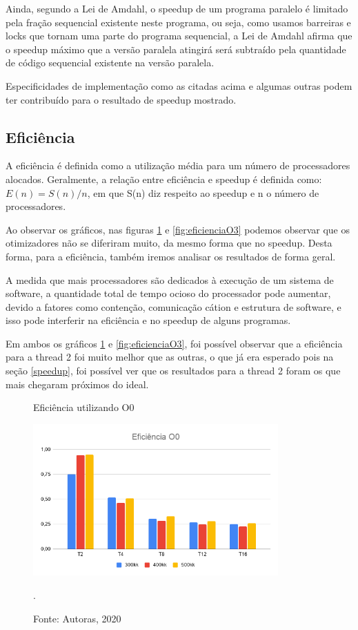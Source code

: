 \documentclass[journal]{IEEEtran}
\begin{document}
 Ainda, segundo a Lei de Amdahl, o speedup de um programa paralelo é limitado pela fração sequencial existente neste programa, ou seja, como usamos barreiras e locks que tornam uma parte do programa sequencial, a Lei de Amdahl afirma que o speedup máximo que a versão paralela atingirá será subtraído pela quantidade de código sequencial existente na versão paralela.
 
 
 Especificidades de implementação como as citadas acima e algumas outras podem ter contribuído para o resultado de speedup mostrado.
 

\subsection{Eficiência}
A eficiência é definida como a utilização média para um número de processadores alocados. Geralmente, a relação entre eficiência e speedup é definida como: $E(n) = S(n)/n$, em que S(n) diz respeito ao speedup e n o número de processadores.

Ao observar os gráficos, nas figuras \ref{fig:eficienciaO0} e \ref{fig:eficienciaO3} podemos observar que os otimizadores não se diferiram muito, da mesmo forma que no speedup. Desta forma, para a eficiência, também iremos analisar os resultados de forma geral. 

A medida que mais processadores são dedicados à execução de um sistema de software, a quantidade total de tempo ocioso do processador pode aumentar, devido a fatores como contenção, comunicação cátion e estrutura de software, e isso pode interferir na eficiência e no speedup de alguns programas.

Em ambos os gráficos \ref{fig:eficienciaO0} e \ref{fig:eficienciaO3}, foi possível observar que a eficiência para a thread 2 foi muito melhor que as outras, o que já era esperado pois na seção \ref{speedup}, foi possível ver que os resultados para a thread 2 foram os que mais chegaram próximos do ideal.



\begin{figure}[H]
    \centering
    \caption{Eficiência utilizando O0}
    \centering
    \includegraphics[width=3.7in]{IEEEtran/imagens/EficienciaO0.png}
    \caption*{Fonte: Autoras, 2020}
    \DeclareGraphicsExtensions.
    \label{fig:eficienciaO0}
\end{figure}
\end{document}
